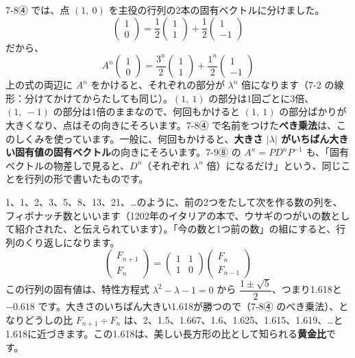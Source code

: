 7-8④ では、点 $(1,\ 0)$ を主役の行列の2本の固有ベクトルに分けました。
\[ \begin{pmatrix}1\\0\end{pmatrix}=\frac{1}{2}\begin{pmatrix}1\\1\end{pmatrix}+\frac{1}{2}\begin{pmatrix}1\\-1\end{pmatrix} \]
だから、
\[ A^n\begin{pmatrix}1\\0\end{pmatrix}=\frac{3^n}{2}\begin{pmatrix}1\\1\end{pmatrix}+\frac{1^n}{2}\begin{pmatrix}1\\-1\end{pmatrix} \]
上の式の両辺に $A^n$ をかけると、それぞれの部分が $\lambda^n$ 倍になります（7-2 の線形：分けてかけてからたしても同じ）。$(1,\ 1)$ の部分は1回ごとに3倍、$(1,\ -1)$ の部分は1倍のままなので、何回もかけると $(1,\ 1)$ の部分ばかりが大きくなり、点はその向きにそろいます。7-8④ で名前をつけた\textbf{べき乗法}は、このしくみを使っています。一般に、何回もかけると、\textbf{大きさ $|\lambda|$ がいちばん大きい固有値の固有ベクトル}の向きにそろいます。7-9⑧ の $A^n=PD^nP^{-1}$ も、「固有ベクトルの物差しで見ると、$D^n$（それぞれ $\lambda^n$ 倍）になるだけ」という、同じことを行列の形で書いたものです。

\begin{motto}[4]
1、1、2、3、5、8、13、21、…のように、前の2つをたして次を作る数の列を、フィボナッチ数といいます（1202年のイタリアの本で、ウサギのつがいの数として紹介された、と伝えられています）。「今の数と1つ前の数」の組にすると、行列のくり返しになります。
\[ \begin{pmatrix}F_{n+1}\\F_n\end{pmatrix}=\begin{pmatrix}1&1\\1&0\end{pmatrix}\begin{pmatrix}F_n\\F_{n-1}\end{pmatrix} \]
この行列の固有値は、特性方程式 $\lambda^2-\lambda-1=0$ から $\dfrac{1\pm\sqrt5}{2}$、つまり1.618と $-0.618$ です。大きさのいちばん大きい1.618が勝つので（7-8④ のべき乗法）、となりどうしの比 $F_{n+1}\div F_n$ は、2、1.5、1.667、1.6、1.625、1.615、1.619、…と1.618に近づきます。この1.618は、美しい長方形の比として知られる\textbf{黄金比}です。
\end{motto}

